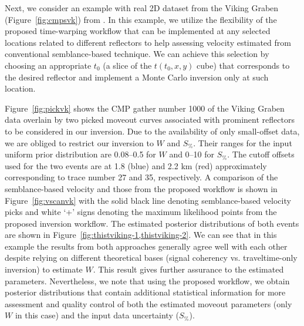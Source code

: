 Next, we consider an example with real 2D dataset from the Viking Graben (Figure~\ref{fig:cmpsvk}) from \cite{viking}. In this example, we utilize the flexibility of the proposed time-warping workflow that can be implemented at any selected locations related to different reflectors to help assessing velocity estimated from conventional semblance-based technique. We can achieve this selection by choosing an appropriate $t_0$ (a slice of the $t(t_0,x,y)$ cube) that corresponds to the desired reflector and implement a Monte Carlo inversion only at such location. 


Figure~\ref{fig:pickvk} shows the CMP gather number 1000 of the Viking Graben data overlain by two picked moveout curves associated with prominent reflectors to be considered in our inversion. Due to the availability of only small-offset data, we are obliged to restrict our inversion to $W$ and $S_{\%}$. Their ranges for the input uniform prior distribution are 0.08--0.5 for $W$ and 0--10 for $S_{\%}$. The cutoff offsets used for the two events are at 1.8 (blue) and 2.2 km (red) approximately corresponding to trace number 27 and 35, respectively. A comparison of the semblance-based velocity and those from the proposed workflow is shown in Figure~\ref{fig:vscanvk} with the solid black line denoting semblance-based velocity picks and white `+' signs denoting the maximum likelihood points from the proposed inversion workflow. The estimated posterior distributions of both events are shown in Figure~\ref{fig:thistviking-1,thistviking-2}. We can see that in this example the results from both approaches generally agree well with each other despite relying on different theoretical bases (signal coherency vs. traveltime-only inversion) to estimate $W$. This result gives further assurance to the estimated parameters. Nevertheless, we note that using the proposed workflow, we obtain posterior distributions that contain additional statistical information for more assessment and quality control of both the estimated moveout parameters (only $W$ in this case) and the input data uncertainty ($S_{\%}$).



